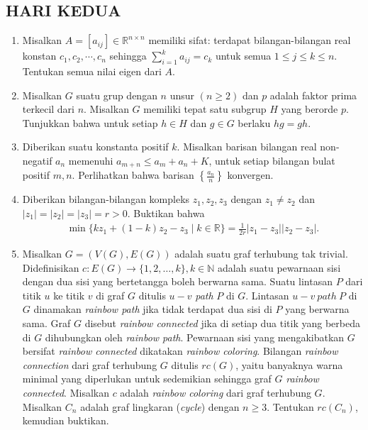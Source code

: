 \documentclass[12pt,twoside]{article}
\begin{document}
\subsection{HARI KEDUA}
\begin{enumerate}
    \item Misalkan $A=[a_{ij}]\in \mathbb{R}^{n\times n}$ memiliki sifat: terdapat bilangan-bilangan real konstan $c_1,c_2,\cdots,c_n$ sehingga $\sum_{i=1}^k a_{ij}=c_k$ untuk semua $1\leq j\leq k\leq n$. Tentukan semua nilai eigen dari $A$.
    \item Misalkan $G$ suatu grup dengan $n$ unsur $(n\geq 2)$ dan $p$ adalah faktor prima terkecil dari $n$. Misalkan $G$ memiliki tepat satu subgrup $H$ yang berorde $p$. Tunjukkan bahwa untuk setiap $h\in H$ dan $g\in G$ berlaku $hg=gh$.
    \item Diberikan suatu konstanta positif $k$. Misalkan barisan bilangan real non-negatif ${a_n}$ memenuhi $a_{m+n}\leq a_m+a_n+K$, untuk setiap bilangan bulat positif $m,n$. Perlihatkan bahwa barisan $\left\{\frac{a_n}{n}\right\}$ konvergen.
    \item Diberikan bilangan-bilangan kompleks $z_1,z_2,z_3$ dengan $z_1\neq z_2$ dan $|z_1|=|z_2|=|z_3|=r>0$. Buktikan bahwa
          \begin{align*}
              \min\{kz_1+(1-k)z_2-z_3\mid k\in \mathbb{R}\} = \frac{1}{2r}|z_1-z_3||z_2-z_3|.
          \end{align*}
    \item Misalkan $G=(V(G),E(G))$ adalah suatu graf terhubung tak trivial. Didefinisikan $c:E(G)\to \{1,2,\dots,k\}, k\in\mathbb{N}$ adalah suatu pewarnaan sisi dengan dua sisi yang bertetangga boleh berwarna sama. Suatu lintasan $P$ dari titik $u$ ke titik $v$ di graf $G$ ditulis $u-v$ \textit{path} $P$ di $G$. Lintasan $u-v~path~P$ di $G$ dinamakan \textit{rainbow path} jika tidak terdapat dua sisi di $P$ yang berwarna sama. Graf $G$ disebut \textit{rainbow connected} jika di setiap dua titik yang berbeda di $G$ dihubungkan oleh \textit{rainbow path}. Pewarnaan sisi yang mengakibatkan $G$ bersifat \textit{rainbow connected} dikatakan \textit{rainbow coloring}. Bilangan \textit{rainbow connection} dari graf terhubung $G$ ditulis $rc(G)$, yaitu banyaknya warna minimal yang diperlukan untuk sedemikian sehingga graf $G$ \textit{rainbow connected}. Misalkan $c$ adalah \textit{rainbow coloring} dari graf terhubung $G$. Misalkan $C_n$ adalah graf lingkaran (\textit{cycle}) dengan $n\geq 3$. Tentukan $rc(C_n)$, kemudian buktikan.
\end{enumerate}
\pagebreak
{}
\end{document}
